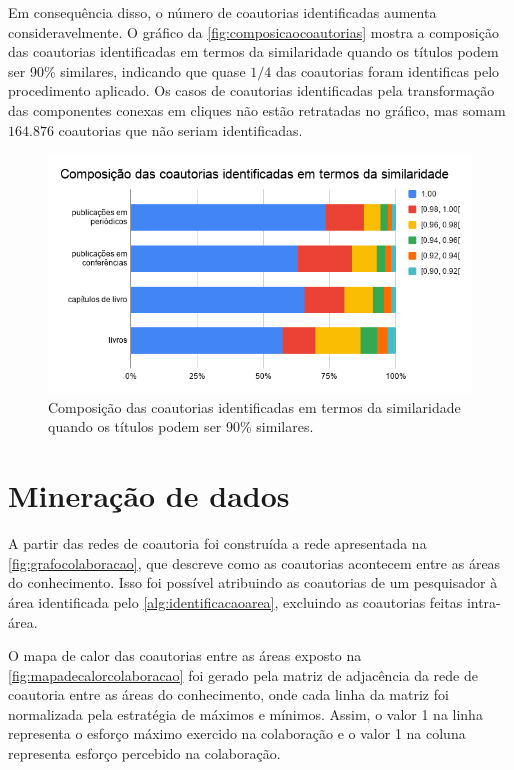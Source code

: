 Em consequência disso, o número de coautorias identificadas aumenta consideravelmente. O gráfico da \autoref{fig:composicaocoautorias} mostra a composição das coautorias identificadas em termos da similaridade quando os títulos podem ser 90\% similares, indicando que quase $1/4$ das coautorias foram identificas pelo procedimento aplicado. Os casos de coautorias identificadas pela transformação das componentes conexas em cliques não estão retratadas no gráfico, mas somam $164.876$ coautorias que não seriam identificadas.

\begin{figure}[htpb]
  \centering
  \includegraphics[scale=.5]{figuras/metodo-composicao-coautorias}
  \caption{Composição das coautorias identificadas em termos da similaridade quando os títulos podem ser 90\% similares.}
  \label{fig:composicaocoautorias}
\end{figure}

\section{Mineração de dados}

A partir das redes de coautoria foi construída a rede apresentada na \autoref{fig:grafocolaboracao}, que descreve como as coautorias acontecem entre as áreas do conhecimento. Isso foi possível atribuindo as coautorias de um pesquisador à área identificada pelo \autoref{alg:identificacaoarea}, excluindo as coautorias feitas intra-área.

O mapa de calor das coautorias entre as áreas exposto na \autoref{fig:mapadecalorcolaboracao} foi gerado pela matriz de adjacência da rede de coautoria entre as áreas do conhecimento, onde cada linha da matriz foi normalizada pela estratégia de máximos e mínimos. Assim, o valor 1 na linha representa o esforço máximo exercido na colaboração e o valor 1 na coluna representa esforço percebido na colaboração.


